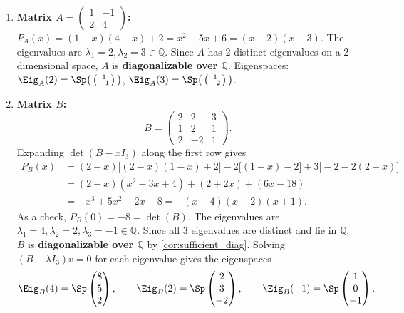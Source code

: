 \begin{exercisesolution*}
\label{sol:diagonalizability_over_Q}
\begin{enumerate}[label=\textbf{(\alph*)}]
    \item \textbf{Matrix $A = \left(\begin{smallmatrix} 1 & -1 \\ 2 & 4 \end{smallmatrix}\right)$:}
    $P_A(x) = (1-x)(4-x) + 2 = x^2 - 5x + 6 = (x-2)(x-3)$.
    The eigenvalues are $\lambda_1 = 2, \lambda_2 = 3 \in \mathbb{Q}$.
    Since $A$ has $2$ distinct eigenvalues on a $2$-dimensional space, $A$ is \textbf{diagonalizable over $\mathbb{Q}$}.
    Eigenspaces: $\Eig_A(2) = \Sp\big(\left(\begin{smallmatrix} 1 \\ -1 \end{smallmatrix}\right)\big)$, $\Eig_A(3) = \Sp\big(\left(\begin{smallmatrix} 1 \\ -2 \end{smallmatrix}\right)\big)$.

    \item \textbf{Matrix $B$:}
    \[
    B = \begin{pmatrix} 2 & 2 & 3 \\ 1 & 2 & 1 \\ 2 & -2 & 1 \end{pmatrix}.
    \]
    Expanding $\det(B - x I_3)$ along the first row gives
    \begin{align*}
    P_B(x) &= (2-x)\bigl[(2-x)(1-x) + 2\bigr] - 2\bigl[(1-x) - 2\bigr] + 3\bigl[-2 - 2(2-x)\bigr] \\
    &= (2-x)(x^2 - 3x + 4) + (2 + 2x) + (6x - 18) \\
    &= -x^3 + 5x^2 - 2x - 8 = -(x-4)(x-2)(x+1).
    \end{align*}
    As a check, $P_B(0) = -8 = \det(B)$.
    The eigenvalues are $\lambda_1 = 4, \lambda_2 = 2, \lambda_3 = -1 \in \mathbb{Q}$.
    Since all $3$ eigenvalues are distinct and lie in $\mathbb{Q}$, $B$ is \textbf{diagonalizable over $\mathbb{Q}$} by \cref{cor:sufficient_diag}.
    Solving $(B - \lambda I_3)v = 0$ for each eigenvalue gives the eigenspaces
    \[
    \Eig_B(4) = \Sp \begin{pmatrix} 8 \\ 5 \\ 2 \end{pmatrix}, \qquad
    \Eig_B(2) = \Sp \begin{pmatrix} 2 \\ 3 \\ -2 \end{pmatrix}, \qquad
    \Eig_B(-1) = \Sp \begin{pmatrix} 1 \\ 0 \\ -1 \end{pmatrix}.
    \]


\end{enumerate}
\end{exercisesolution*}
